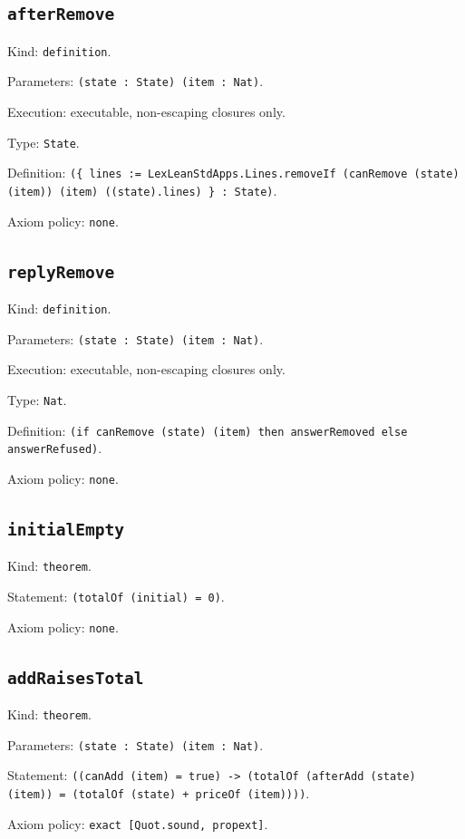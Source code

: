 \documentclass[11pt]{article}
\begin{document}
\subsection*{\texttt{afterRemove}}
\noindent Kind: \texttt{definition}.\par
\noindent Parameters: \texttt{(state : State) (item : Nat)}.\par
\noindent Execution: executable, non-escaping closures only.\par
\noindent Type: \texttt{State}.\par
\noindent Definition: \texttt{(\{ lines := LexLeanStdApps.Lines.removeIf (canRemove (state) (item)) (item) ((state).lines) \} : State)}.\par
\noindent Axiom policy: \texttt{none}.\par
\subsection*{\texttt{replyRemove}}
\noindent Kind: \texttt{definition}.\par
\noindent Parameters: \texttt{(state : State) (item : Nat)}.\par
\noindent Execution: executable, non-escaping closures only.\par
\noindent Type: \texttt{Nat}.\par
\noindent Definition: \texttt{(if canRemove (state) (item) then answerRemoved else answerRefused)}.\par
\noindent Axiom policy: \texttt{none}.\par
\subsection*{\texttt{initialEmpty}}
\noindent Kind: \texttt{theorem}.\par
\noindent Statement: \texttt{(totalOf (initial) = 0)}.\par
\noindent Axiom policy: \texttt{none}.\par
\subsection*{\texttt{addRaisesTotal}}
\noindent Kind: \texttt{theorem}.\par
\noindent Parameters: \texttt{(state : State) (item : Nat)}.\par
\noindent Statement: \texttt{((canAdd (item) = true) -> (totalOf (afterAdd (state) (item)) = (totalOf (state) + priceOf (item))))}.\par
\noindent Axiom policy: \texttt{exact [Quot.sound, propext]}.\par
\end{document}

